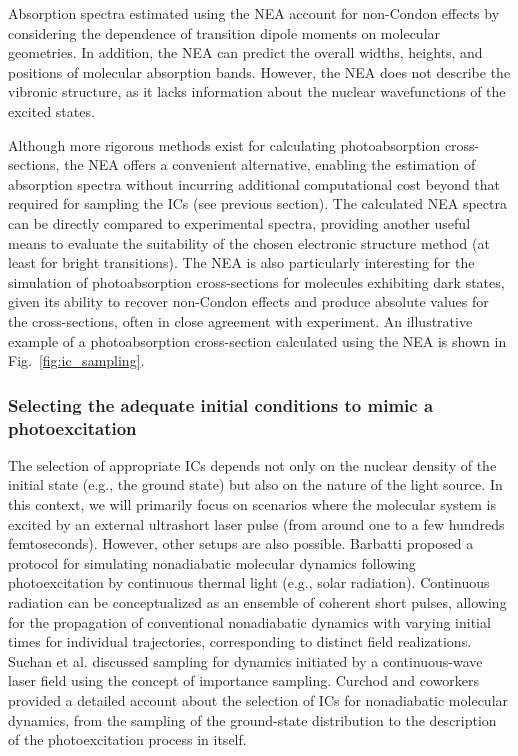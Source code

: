 \documentclass[9pt,bestpractices,pubversion]{livecoms}
\begin{document}
Absorption spectra estimated using the NEA account for non-Condon effects by considering the dependence of transition dipole moments on molecular geometries. In addition, the NEA can predict the overall widths, heights, and positions of molecular absorption bands. However, the NEA does not describe the vibronic structure, as it lacks information about the nuclear wavefunctions of the excited states.\cite{crespo2014spectrum,crespo2018recent}

Although more rigorous methods exist for calculating photoabsorption cross-sections,\cite{prlj2021calculating,santoro2016beyondvert} the NEA offers a convenient alternative, enabling the estimation of absorption spectra without incurring additional computational cost beyond that required for sampling the ICs (see previous section). The calculated NEA spectra can be directly compared to experimental spectra, providing another useful means to evaluate the suitability of the chosen electronic structure method (at least for bright transitions). The NEA is also particularly interesting for the simulation of photoabsorption cross-sections for molecules exhibiting dark states, given its ability to recover non-Condon effects and produce absolute values for the cross-sections, often in close agreement with experiment.\cite{prlj2021calculating} An illustrative example of a photoabsorption cross-section calculated using the NEA is shown in Fig.~\ref{fig:ic_sampling}.

\subsubsection{Selecting the adequate initial conditions to mimic a photoexcitation}
\label{sec:initcond}

The selection of appropriate ICs depends not only on the nuclear density of the initial state (e.g., the ground state) but also on the nature of the light source. In this context, we will primarily focus on scenarios where the molecular system is excited by an external ultrashort laser pulse (from around one to a few hundreds femtoseconds). However, other setups are also possible. Barbatti\cite{barbatti2020simulation} proposed a protocol for simulating nonadiabatic molecular dynamics following photoexcitation by continuous thermal light (e.g., solar radiation). Continuous radiation can be conceptualized as an ensemble of coherent short pulses, allowing for the propagation of conventional nonadiabatic dynamics with varying initial times for individual trajectories, corresponding to distinct field realizations. Suchan et al.\cite{suchan2018importance} discussed sampling for dynamics initiated by a continuous-wave laser field using the concept of importance sampling. Curchod and coworkers\cite{janos2025selecting} provided a detailed account about the selection of ICs for nonadiabatic molecular dynamics, from the sampling of the ground-state distribution to the description of the photoexcitation process in itself. 
\end{document}
